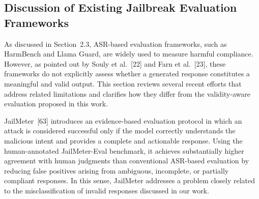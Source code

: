 \documentclass{article}
\begin{document}






\color{blue}
\subsection{Discussion of Existing Jailbreak Evaluation Frameworks}

As discussed in Section~2.3, ASR-based evaluation frameworks, such as HarmBench and Llama Guard, are widely used to measure harmful compliance. However, as pointed out by Souly et al.~[22] and Farn et al.~[23], these frameworks do not explicitly assess whether a generated response constitutes a meaningful and valid output. This section reviews several recent efforts that address related limitations and clarifies how they differ from the validity-aware evaluation proposed in this work.

JailMeter~[63] introduces an evidence-based evaluation protocol in which an attack is considered successful only if the model correctly understands the malicious intent and provides a complete and actionable response. Using the human-annotated JailMeter-Eval benchmark, it achieves substantially higher agreement with human judgments than conventional ASR-based evaluation by reducing false positives arising from ambiguous, incomplete, or partially compliant responses. In this sense, JailMeter addresses a problem closely related to the misclassification of invalid responses discussed in our work.
\end{document}
